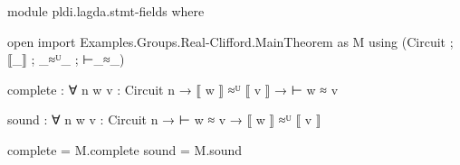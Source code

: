 \begin{code}[hide]
module pldi.lagda.stmt-fields where

open import Examples.Groups.Real-Clifford.MainTheorem as M
  using (Circuit ; ⟦_⟧ ; _≈ᵁ_ ; ⊢_≈_)
\end{code}
\begin{code}[number=agda:complete]
complete : ∀ {n} {w v : Circuit n} → ⟦ w ⟧ ≈ᵁ ⟦ v ⟧ → ⊢ w ≈ v
\end{code}
\begin{code}[number=agda:sound]
sound : ∀ {n} {w v : Circuit n} → ⊢ w ≈ v → ⟦ w ⟧ ≈ᵁ ⟦ v ⟧
\end{code}
\begin{code}[hide]
complete = M.complete
sound = M.sound
\end{code}
